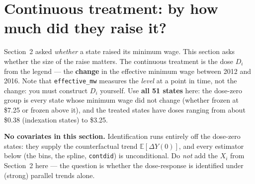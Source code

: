 \documentclass[11pt,a4paper]{article}
\newcommand{\code}[1]{\texttt{\color{ChiantiRed}#1}}
\newcommand{\E}{\mathbb{E}}
\begin{document}
\section{Continuous treatment: by how much did they raise it?}

Section~2 asked \emph{whether} a state raised its minimum wage. This section asks whether the size of the raise matters. The continuous treatment is the dose $D_i$ from the legend --- the \textbf{change} in the effective minimum wage between 2012 and 2016. Note that \code{effective\_mw} measures the \emph{level} at a point in time, not the change: you must construct $D_i$ yourself. Use \textbf{all 51 states} here: the dose-zero group is every state whose minimum wage did not change (whether frozen at \$7.25 or frozen above it), and the treated states have doses ranging from about \$0.38 (indexation states) to \$3.25.

\smallskip
\noindent\textbf{No covariates in this section.} Identification runs entirely off the dose-zero states: they supply the counterfactual trend $\E[\Delta Y(0)]$, and every estimator below (the bins, the spline, \code{contdid}) is unconditional. Do \emph{not} add the $X_i$ from Section~2 here --- the question is whether the dose-response is identified under (strong) parallel trends alone.
\end{document}
